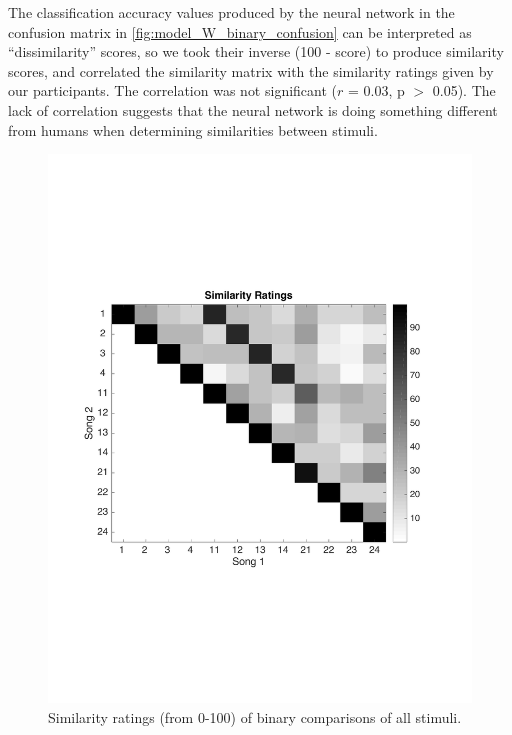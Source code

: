The classification accuracy values produced by the neural network in the confusion matrix in \autoref{fig:model_W_binary_confusion} can be interpreted as ``dissimilarity'' scores, so we took their inverse (100 - score) to produce similarity scores, and correlated the similarity matrix with the similarity ratings given by our participants.
The correlation was not significant ($r$ = 0.03, p $>$ 0.05).
The lack of correlation suggests that the neural network is doing something different from humans when determining similarities between stimuli. 
\begin{figure}[htb] 
  \begin{center}
    \includegraphics[scale=0.6]{Figures/Similarity}
    \caption{Similarity ratings (from 0-100) of binary comparisons of all stimuli.}
    \label{fig:Similarity}
  \end{center}
\end{figure}